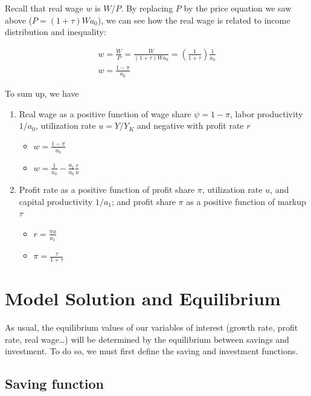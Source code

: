 \documentclass[
  letterpaper,
  DIV=11,
  numbers=noendperiod]{scrreprt}
\providecommand{\tightlist}{%
  \setlength{\itemsep}{0pt}\setlength{\parskip}{0pt}}\usepackage{longtable,booktabs,array}
\begin{document}
Recall that real wage \(w\) is \(W/P\). By replacing \(P\) by the price
equation we saw above (\(P = (1 + \tau)Wa_0\)), we can see how the real
wage is related to income distribution and inequality:

\[
\begin{aligned}
w = \frac{W}{P} = \frac{W}{(1+\tau)Wa_0} = (\frac{1}{1+\tau})\frac{1}{a_0}
\\
w = \frac{1 - \pi}{a_0}
\end{aligned}
\]

To sum up, we have

\begin{enumerate}
\def\labelenumi{\arabic{enumi}.}
\item
  Real wage as a positive function of wage share \(\psi = 1-\pi\), labor
  productivity \(1/a_0\), utilization rate \(u = Y/Y_K\) and negative
  with profit rate \(r\)

  \begin{itemize}
  \tightlist
  \item
    \(w = \frac{1 - \pi}{a_0}\)
  \item
    \(w = \frac{1}{a_0} - \frac{a_1}{a_0} \frac{r}{u}\)
  \end{itemize}
\item
  Profit rate as a positive function of profit share \(\pi\),
  utilization rate \(u\), and capital productivity \(1/a_1\); and profit
  share \(\pi\) as a positive function of markup \(\tau\)

  \begin{itemize}
  \tightlist
  \item
    \(r = \frac{\pi u}{a_1}\)
  \item
    \(\pi = \frac{\tau}{1+\tau}\)
  \end{itemize}
\end{enumerate}

\hypertarget{model-solution-and-equilibrium}{%
\section{Model Solution and
Equilibrium}\label{model-solution-and-equilibrium}}

As usual, the equilibrium values of our variables of interest (growth
rate, profit rate, real wage\ldots) will be determined by the
equilibrium between savings and investment. To do so, we must first
define the saving and investment functions.

\hypertarget{saving-function-1}{%
\subsection{Saving function}\label{saving-function-1}}
\end{document}
